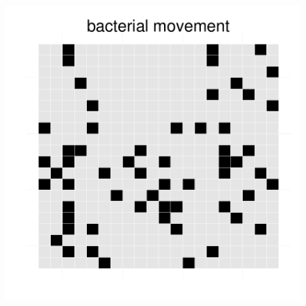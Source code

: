 \begin{figure}[h]
{\begin{minipage}[t]{0.3\textwidth}
  \end{minipage}
  \begin{minipage}[t]{0.3\textwidth}
    \includegraphics[width=\textwidth]{../results/barkeri_beijerinckii_20x20_seed6764_bac150.pdf}
  \end{minipage}
  }
\end{figure}
